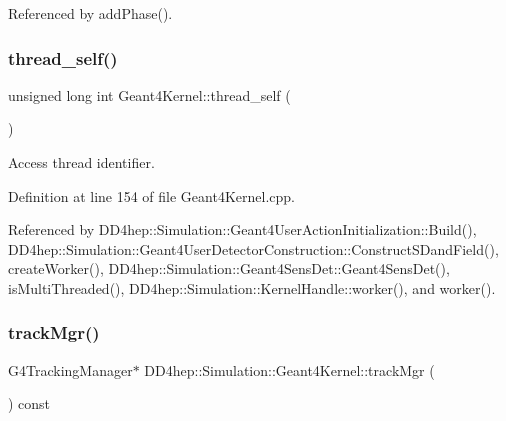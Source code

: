 Referenced by add\+Phase().

\hypertarget{class_d_d4hep_1_1_simulation_1_1_geant4_kernel_a6f7fb6760f8432658a837a65bb557fe5}{}\label{class_d_d4hep_1_1_simulation_1_1_geant4_kernel_a6f7fb6760f8432658a837a65bb557fe5} 
\subsubsection{\texorpdfstring{thread\+\_\+self()}{thread\_self()}}
{\footnotesize\ttfamily unsigned long int Geant4\+Kernel\+::thread\+\_\+self (\begin{DoxyParamCaption}{ }\end{DoxyParamCaption})\hspace{0.3cm}{\ttfamily [static]}}



Access thread identifier. 



Definition at line 154 of file Geant4\+Kernel.\+cpp.



Referenced by D\+D4hep\+::\+Simulation\+::\+Geant4\+User\+Action\+Initialization\+::\+Build(), D\+D4hep\+::\+Simulation\+::\+Geant4\+User\+Detector\+Construction\+::\+Construct\+S\+Dand\+Field(), create\+Worker(), D\+D4hep\+::\+Simulation\+::\+Geant4\+Sens\+Det\+::\+Geant4\+Sens\+Det(), is\+Multi\+Threaded(), D\+D4hep\+::\+Simulation\+::\+Kernel\+Handle\+::worker(), and worker().

\hypertarget{class_d_d4hep_1_1_simulation_1_1_geant4_kernel_aad8ca2fc43ef4a468bd64ed1e0b164f1}{}\label{class_d_d4hep_1_1_simulation_1_1_geant4_kernel_aad8ca2fc43ef4a468bd64ed1e0b164f1} 
\subsubsection{\texorpdfstring{track\+Mgr()}{trackMgr()}}
{\footnotesize\ttfamily G4\+Tracking\+Manager$\ast$ D\+D4hep\+::\+Simulation\+::\+Geant4\+Kernel\+::track\+Mgr (\begin{DoxyParamCaption}{ }\end{DoxyParamCaption}) const\hspace{0.3cm}{\ttfamily [inline]}}



